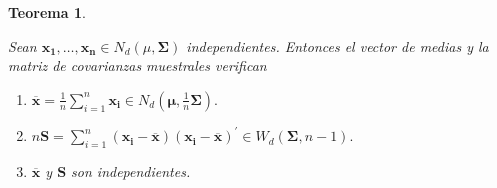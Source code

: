 \documentclass[
  a4paper,
  oneside]{scrbook}
\newtheorem{theorem}{Teorema}[chapter]
\theoremstyle{definition}
\theoremstyle{definition}
\theoremstyle{definition}
\theoremstyle{definition}
\theoremstyle{remark}
\begin{document}
\begin{theorem}
\protect\hypertarget{thm:unnamed-chunk-102}{}\label{thm:unnamed-chunk-102}

Sean \(\bm{x_1},\ldots,\bm{x_n}\in N_d(\mu,\bm\Sigma)\) independientes.
Entonces el vector de medias y la matriz de covarianzas muestrales
verifican

\begin{enumerate}
\def\labelenumi{\arabic{enumi}.}
\item
  \({\overline{\bm{x}}=\frac{1}{n}\sum_{i=1}^n \bm{x_i} \in N_d\left(\bm{\mu},\frac{1}{n}\bm\Sigma\right)}.\)
\item
  \({n\bm{S}=\sum_{i=1}^n \left(\bm{x_i}-\overline{\bm{x}}\right)\left(\bm{x_i}-\overline{\bm{x}}\right)^\prime{}
  \in W_d\left(\bm\Sigma,n-1\right)}.\)
\item
  \(\overline{\bm{x}}\) y \(\bm{S}\) son independientes.
\end{enumerate}

\end{theorem}
\end{document}
